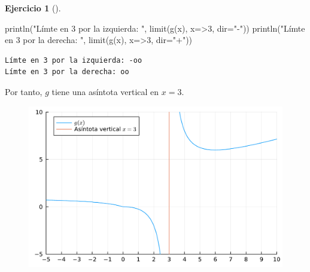 \documentclass[
  a4paper,
]{scrreport}
\newenvironment{Shaded}{\begin{snugshade}}{\end{snugshade}}
\newcommand{\FloatTok}[1]{\textcolor[rgb]{0.68,0.00,0.00}{#1}}
\newcommand{\FunctionTok}[1]{\textcolor[rgb]{0.28,0.35,0.67}{#1}}
\newcommand{\NormalTok}[1]{\textcolor[rgb]{0.00,0.23,0.31}{#1}}
\newcommand{\OperatorTok}[1]{\textcolor[rgb]{0.37,0.37,0.37}{#1}}
\newcommand{\SpecialCharTok}[1]{\textcolor[rgb]{0.37,0.37,0.37}{#1}}
\newcommand{\StringTok}[1]{\textcolor[rgb]{0.13,0.47,0.30}{#1}}
\theoremstyle{definition}
\newtheorem{exercise}{Ejercicio}[chapter]
\theoremstyle{remark}
\begin{document}
\begin{exercise}[]
\begin{tcolorbox}
\begin{Shaded}
\begin{Highlighting}[]
\FunctionTok{println}\NormalTok{(}\StringTok{"Límte en 3 por la izquierda: "}\NormalTok{, }\FunctionTok{limit}\NormalTok{(}\FunctionTok{g}\NormalTok{(x), x}\OperatorTok{=\textgreater{}}\FloatTok{3}\NormalTok{, dir}\OperatorTok{=}\StringTok{"{-}"}\NormalTok{))}
\FunctionTok{println}\NormalTok{(}\StringTok{"Límte en 3 por la derecha: "}\NormalTok{, }\FunctionTok{limit}\NormalTok{(}\FunctionTok{g}\NormalTok{(x), x}\OperatorTok{=\textgreater{}}\FloatTok{3}\NormalTok{, dir}\OperatorTok{=}\StringTok{"+"}\NormalTok{))}
\end{Highlighting}
\end{Shaded}

\begin{verbatim}
Límte en 3 por la izquierda: -oo
Límte en 3 por la derecha: oo
\end{verbatim}

Por tanto, \(g\) tiene una asíntota vertical en \(x=3\).

\begin{Shaded}
\end{Shaded}

\begin{figure}[H]

{\centering \includegraphics{./limites_files/figure-pdf/cell-26-output-1.pdf}

}


\end{figure}
\end{tcolorbox}
\end{exercise}
\end{document}
